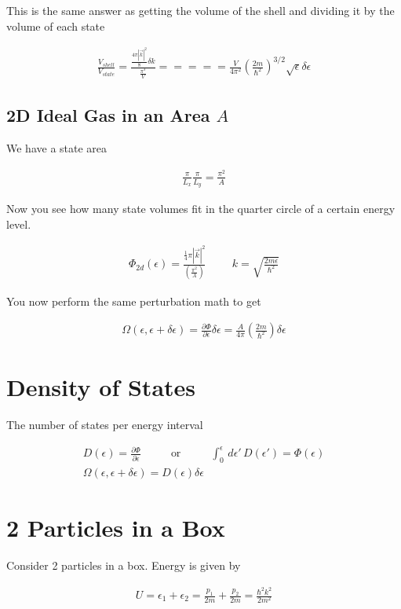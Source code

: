 \documentclass[fleqn]{report}
\newcommand{\hp}{\hspace{1cm}}
\newcommand{\del}{\partial}
\newcommand{\equations} [1] {
\begin{gather*}
#1
\end{gather*}
}
\begin{document}
This is the same answer as getting the volume of the shell and 
dividing it by the volume of each state 

\equations{
    \frac{V_{shell}}{V_{state}}
    =
    \frac{
        \frac{4 \pi |\vec k|^2}{8} \delta k
    }
    {
        \frac{\pi^3}{V}
    }
    =====
    \frac{V}{4 \pi^2}
    \left(
        \frac{2m}{\hbar^2}
    \right)^{3/2}
    \sqrt{\epsilon}
    \delta \epsilon
}

\subsection{2D Ideal Gas in an Area $A$}
We have a state area 
\equations{
    \frac{\pi}{L_x}
    \frac{\pi}{L_y}
    =
    \frac{\pi^2}{A}
}

Now you see how many state volumes fit in the quarter circle 
of a certain energy level. 

\equations{
    \Phi_{2d}(\epsilon)
    =
    \frac{
        \frac{1}{4}
        \pi |\vec k|^2
    }
    {
        \left(
            \frac{\pi^2}{A}
        \right)
    }
    \hp 
    k 
    =
    \sqrt{\frac{2m \epsilon}{\hbar^2}}
}

You now perform the same perturbation math to get 
\equations{
    \Omega(\epsilon, \epsilon + \delta \epsilon)
    =
    \frac{\del \Phi}{\del \epsilon}
    \delta \epsilon 
    =
    \frac{A}{4 \pi}
    \left(
        \frac{2m}{\hbar^2}
    \right)
    \delta \epsilon
}

\section{Density of States}
The number of states per energy interval 

\equations{
    D(\epsilon)
    =
    \frac{\del \Phi}{\del \epsilon}
    \hp
    \textrm{ or }
    \hp
    \int^\epsilon_0
    \, d \epsilon' \, 
    D(\epsilon')
    =
    \Phi(\epsilon)
    \\
    \Omega(\epsilon, \epsilon + \delta \epsilon)
    =
    D(\epsilon)
    \delta \epsilon
}

\section{2 Particles in a Box}
Consider 2 particles in a box. Energy is given by 
\equations{
    U 
    =
    \epsilon_1 
    +
    \epsilon_2
    =
    \frac{p_1}{2m}
    +
    \frac{p_2}{2m}
    =
    \frac{\hbar^2 k^2}{2m^2}
}
\end{document}
